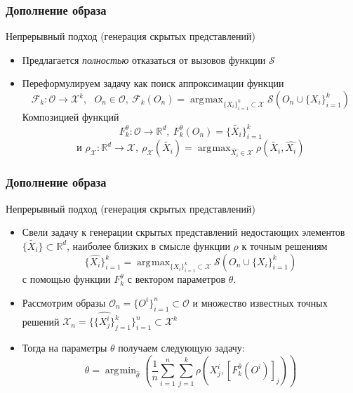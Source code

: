 \documentclass[10pt]{beamer}
\DeclareMathOperator*{\argmax}{\arg\!\max}
\DeclareMathOperator*{\argmin}{\arg\!\min}
\begin{document}
\begin{frame}
	\frametitle{Дополнение образа}
	\begin{block}{Непрерывный подход (генерация скрытых представлений)}
		\begin{itemize}
			\item Предлагается \textit{полностью} отказаться от вызовов функции $\mathcal{S}$
			\item Переформулируем задачу как поиск аппроксимации функции 
			$$\mathcal{F}_k: \mathcal{O}\longrightarrow \mathcal{X}^k, ~~~O_n\in \mathcal{O},~ \mathcal{F}_k(O_n) = \argmax_{\{X_i\}_{i=1}^k\subset\mathcal{X}} \mathcal{S}\left(O_n\cup\{X_i\}_{i=1}^k\right)$$
			Композицией функций 
			$$F_k^\theta: \mathcal{O}\longrightarrow \mathbb{R}^d, ~F_k^\theta(O_n) = \{\tilde{X_i}\}_{i=1}^k$$
			$$\text{и }\rho_\mathcal{X}: \mathbb{R}^d\longrightarrow \mathcal{X}, ~ \rho_\mathcal{X}(\tilde{X_i}) = \argmax_{\hat{X_i}\in\mathcal{X}}\rho(\tilde{X_i}, \hat{X_i})$$
		\end{itemize}
	\end{block}
\end{frame}


\begin{frame}
	\frametitle{Дополнение образа}
	\begin{block}{Непрерывный подход (генерация скрытых представлений)}
		\begin{itemize}
			\item Свели задачу к генерации скрытых представлений недостающих элементов $\{\tilde{X_i}\}\subset \mathbb{R}^d$, наиболее близких в смысле функции $\rho$ к точным решениям
			$$\{\hat{X_i}\}_{i=1}^k= \argmax_{\{X_i\}_{i=1}^k\subset\mathcal{X}} \mathcal{S}\left(O_n\cup\{X_i\}_{i=1}^k\right)$$
			с помощью функции  $F_k^\theta$ с вектором параметров $\theta$. 
			\item Рассмотрим образы $\mathcal{O}_n = \{O^i\}_{i=1}^n \subset\mathcal{O}$ и множество известных точных решений $\mathcal{X}_n =\{\{\hat{X_j^i}\}_{j=1}^k\}_{i=1}^n\subset\mathcal{X}^k$
			\item Тогда на параметры $\theta$ получаем следующую задачу:
			$$\theta = \argmin_{\hat{\theta}}\left( \frac{1}{n}\sum_{i=1}^n\sum_{j=1}^k\rho\left(X_j^i, [F_k^{\hat{\theta}}(O^i)]_j\right)\right)$$
		\end{itemize}
\end{block}
\end{frame}
\end{document}
